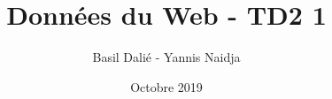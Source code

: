 \documentclass{report}
\title{Données du Web - TD2 1}
\author{Basil Dalié - Yannis Naidja}
\date{Octobre 2019}
\begin{document}
\maketitle









\begin{appendix}
  
  
  
  
  
\end{appendix}
\end{document}
